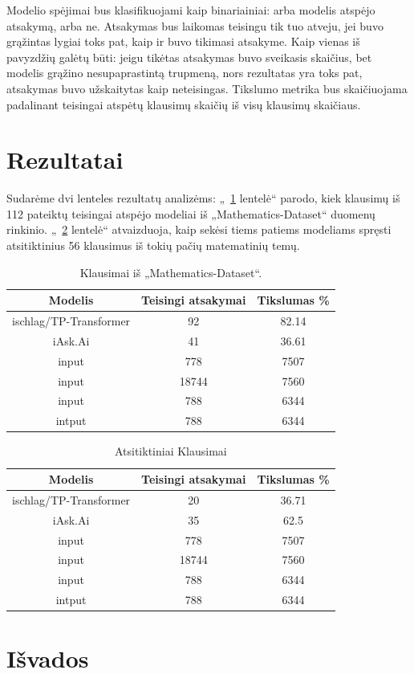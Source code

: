 \documentclass[conference]{IEEEtran}
\begin{document}
Modelio spėjimai bus klasifikuojami kaip binariainiai: arba modelis atspėjo atsakymą, arba ne.
Atsakymas bus laikomas teisingu tik tuo atveju, jei buvo grąžintas lygiai toks pat, kaip ir buvo tikimasi atsakyme.
Kaip vienas iš pavyzdžių galėtų būti: jeigu tikėtas atsakymas buvo sveikasis skaičius, bet modelis grąžino
nesupaprastintą trupmeną, nors rezultatas yra toks pat, atsakymas buvo užskaitytas kaip neteisingas.
Tikslumo metrika bus skaičiuojama padalinant teisingai atspėtų klausimų skaičių iš visų klausimų skaičiaus.

\section{Rezultatai}
Sudarėme dvi lenteles rezultatų analizėms: „~\ref{lentele:1} lentelė“ parodo, kiek klausimų iš 112 pateiktų
teisingai atspėjo modeliai iš „Mathematics-Dataset“ duomenų rinkinio. „~\ref{lentele:2} lentelė“  atvaizduoja,
kaip sekėsi tiems patiems modeliams spręsti atsitiktinius 56 klausimus iš tokių pačių matematinių temų.

\begin{table}[h!]
    \centering
    \caption{Klausimai iš „Mathematics-Dataset“.}
    \label{lentele:1}
    \begin{tabular}{|c c c|} 
     \hline
     Modelis & Teisingi atsakymai & Tikslumas \% \\ [0.5ex] 
     \hline\hline
     ischlag/TP-Transformer & 92 & 82.14 \\ 
     \hline
     iAsk.Ai & 41 & 36.61 \\
     \hline
     input & 778 & 7507 \\
     \hline
     input &  18744 & 7560 \\
     \hline
     input & 788 & 6344 \\
     \hline
     intput & 788 & 6344 \\
     \hline
    \end{tabular}
    \end{table}

\begin{table}[h!]
        \centering
        \caption{Atsitiktiniai Klausimai}
        \label{lentele:2}
        \begin{tabular}{|c c c|} 
        \hline
        Modelis & Teisingi atsakymai & Tikslumas \% \\ [0.5ex] 
        \hline\hline
        ischlag/TP-Transformer & 20 & 36.71 \\ 
        \hline
        iAsk.Ai & 35 & 62.5 \\
        \hline
        input & 778 & 7507 \\
        \hline
        input &  18744 & 7560 \\
        \hline
        input & 788 & 6344 \\
        \hline
        intput & 788 & 6344 \\
        \hline
    \end{tabular}
    \end{table}

\section{Išvados}





\end{document}
